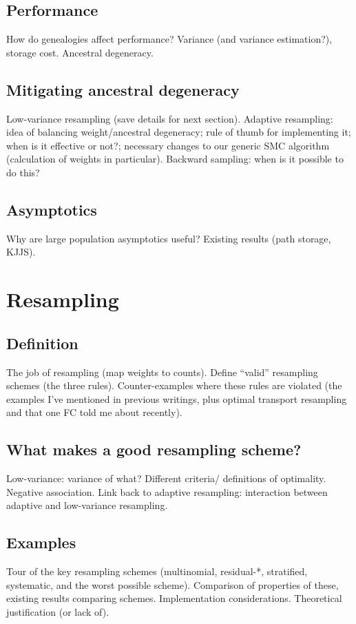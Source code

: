 \subsection{Performance}
How do genealogies affect performance? Variance (and variance estimation?), storage cost. Ancestral degeneracy.

\subsection{Mitigating ancestral degeneracy}
Low-variance resampling (save details for next section). Adaptive resampling: idea of balancing weight/ancestral degeneracy; rule of thumb for implementing it; when is it effective or not?; necessary changes to our generic SMC algorithm (calculation of weights in particular). Backward sampling: when is it possible to do this?

\subsection{Asymptotics}
Why are large population asymptotics useful? Existing results (path storage, KJJS).


\section{Resampling}

\subsection{Definition}
The job of resampling (map weights to counts). Define ``valid'' resampling schemes (the three rules). Counter-examples where these rules are violated (the examples I've mentioned in previous writings, plus optimal transport resampling and that one FC told me about recently).

\subsection{What makes a good resampling scheme?}
Low-variance: variance of what? Different criteria/ definitions of optimality. Negative association. Link back to adaptive resampling: interaction between adaptive and low-variance resampling.

\subsection{Examples}
Tour of the key resampling schemes (multinomial, residual-*, stratified, systematic, and the worst possible scheme). Comparison of properties of these, existing results comparing schemes. Implementation considerations. Theoretical justification (or lack of).

